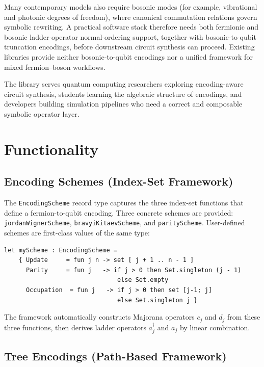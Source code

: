 \documentclass[10pt,a4paper]{article}
\begin{document}
Many contemporary models also require bosonic modes (for example,
vibrational and photonic degrees of freedom), where canonical
commutation relations govern symbolic rewriting.  A practical software
stack therefore needs both fermionic and bosonic ladder-operator
normal-ordering support, together with bosonic-to-qubit truncation
encodings, before downstream circuit synthesis can proceed.  Existing
libraries provide neither bosonic-to-qubit encodings nor a unified
framework for mixed fermion--boson workflows.

The library serves quantum computing researchers exploring
encoding-aware circuit synthesis, students learning the algebraic
structure of encodings, and developers building simulation pipelines who
need a correct and composable symbolic operator layer.

\section*{Functionality}

\subsection*{Encoding Schemes (Index-Set Framework)}

The \texttt{EncodingScheme} record type captures the three index-set
functions that define a fermion-to-qubit encoding.  Three concrete
schemes are provided: \texttt{jordanWignerScheme},
\texttt{bravyiKitaevScheme}, and \texttt{parityScheme}.  User-defined
schemes are first-class values of the same type:

\begin{lstlisting}
let myScheme : EncodingScheme =
    { Update     = fun j n -> set [ j + 1 .. n - 1 ]
      Parity     = fun j   -> if j > 0 then Set.singleton (j - 1)
                               else Set.empty
      Occupation  = fun j   -> if j > 0 then set [j-1; j]
                               else Set.singleton j }
\end{lstlisting}

The framework automatically constructs Majorana operators $c_j$ and
$d_j$ from these three functions, then derives ladder operators
$a^\dagger_j$ and $a_j$ by linear combination.

\subsection*{Tree Encodings (Path-Based Framework)}
\end{document}
